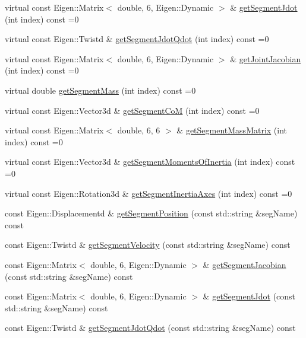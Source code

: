 \begin{DoxyCompactItemize}
virtual const Eigen\+::\+Matrix$<$ double, 6, Eigen\+::\+Dynamic $>$ \& \hyperlink{classocra_1_1Model_a00cceda96b47bee05cb6366d070d7961}{get\+Segment\+Jdot} (int index) const =0
\item 
virtual const Eigen\+::\+Twistd \& \hyperlink{classocra_1_1Model_a6fe0178b1e8213e39366b2355d0d4de3}{get\+Segment\+Jdot\+Qdot} (int index) const =0
\item 
virtual const Eigen\+::\+Matrix$<$ double, 6, Eigen\+::\+Dynamic $>$ \& \hyperlink{classocra_1_1Model_ad0001f469b4aa484403e781f6bd933aa}{get\+Joint\+Jacobian} (int index) const =0
\item 
virtual double \hyperlink{classocra_1_1Model_a9840649a6137c8ec964914f91c83a1b9}{get\+Segment\+Mass} (int index) const =0
\item 
virtual const Eigen\+::\+Vector3d \& \hyperlink{classocra_1_1Model_a577292e1e1441afbecb3912124b7eb04}{get\+Segment\+CoM} (int index) const =0
\item 
virtual const Eigen\+::\+Matrix$<$ double, 6, 6 $>$ \& \hyperlink{classocra_1_1Model_ae795ffdaa76419eb74acba87555b83bb}{get\+Segment\+Mass\+Matrix} (int index) const =0
\item 
virtual const Eigen\+::\+Vector3d \& \hyperlink{classocra_1_1Model_ae296f35e785641df23e6cf4fdbb24f8a}{get\+Segment\+Moments\+Of\+Inertia} (int index) const =0
\item 
virtual const Eigen\+::\+Rotation3d \& \hyperlink{classocra_1_1Model_a09d58bf429940098baf9727140e37441}{get\+Segment\+Inertia\+Axes} (int index) const =0
\item 
const Eigen\+::\+Displacementd \& \hyperlink{classocra_1_1Model_a1ca7aa03dd8a2dcea7f9ff2feff54e94}{get\+Segment\+Position} (const std\+::string \&seg\+Name) const 
\item 
const Eigen\+::\+Twistd \& \hyperlink{classocra_1_1Model_aea663abc07b3b5bb8a695ffdc28167f9}{get\+Segment\+Velocity} (const std\+::string \&seg\+Name) const 
\item 
const Eigen\+::\+Matrix$<$ double, 6, Eigen\+::\+Dynamic $>$ \& \hyperlink{classocra_1_1Model_a9110ef2443aea27cf854679a31104dd8}{get\+Segment\+Jacobian} (const std\+::string \&seg\+Name) const 
\item 
const Eigen\+::\+Matrix$<$ double, 6, Eigen\+::\+Dynamic $>$ \& \hyperlink{classocra_1_1Model_a9d684947a13bdafd5e79389f7aa2288b}{get\+Segment\+Jdot} (const std\+::string \&seg\+Name) const 
\item 
const Eigen\+::\+Twistd \& \hyperlink{classocra_1_1Model_ae075a3fd0a1ea61df20291484366ef64}{get\+Segment\+Jdot\+Qdot} (const std\+::string \&seg\+Name) const 

\end{DoxyCompactItemize}
